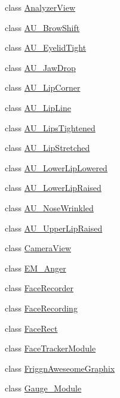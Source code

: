 \begin{DoxyCompactItemize}
\item 
class \hyperlink{class_real_sense_1_1_analyzer_view}{Analyzer\+View}
\item 
class \hyperlink{class_real_sense_1_1_a_u___brow_shift}{A\+U\+\_\+\+Brow\+Shift}
\item 
class \hyperlink{class_real_sense_1_1_a_u___eyelid_tight}{A\+U\+\_\+\+Eyelid\+Tight}
\item 
class \hyperlink{class_real_sense_1_1_a_u___jaw_drop}{A\+U\+\_\+\+Jaw\+Drop}
\item 
class \hyperlink{class_real_sense_1_1_a_u___lip_corner}{A\+U\+\_\+\+Lip\+Corner}
\item 
class \hyperlink{class_real_sense_1_1_a_u___lip_line}{A\+U\+\_\+\+Lip\+Line}
\item 
class \hyperlink{class_real_sense_1_1_a_u___lips_tightened}{A\+U\+\_\+\+Lips\+Tightened}
\item 
class \hyperlink{class_real_sense_1_1_a_u___lip_stretched}{A\+U\+\_\+\+Lip\+Stretched}
\item 
class \hyperlink{class_real_sense_1_1_a_u___lower_lip_lowered}{A\+U\+\_\+\+Lower\+Lip\+Lowered}
\item 
class \hyperlink{class_real_sense_1_1_a_u___lower_lip_raised}{A\+U\+\_\+\+Lower\+Lip\+Raised}
\item 
class \hyperlink{class_real_sense_1_1_a_u___nose_wrinkled}{A\+U\+\_\+\+Nose\+Wrinkled}
\item 
class \hyperlink{class_real_sense_1_1_a_u___upper_lip_raised}{A\+U\+\_\+\+Upper\+Lip\+Raised}
\item 
class \hyperlink{class_real_sense_1_1_camera_view}{Camera\+View}
\item 
class \hyperlink{class_real_sense_1_1_e_m___anger}{E\+M\+\_\+\+Anger}
\item 
class \hyperlink{class_real_sense_1_1_face_recorder}{Face\+Recorder}
\item 
class \hyperlink{class_real_sense_1_1_face_recording}{Face\+Recording}
\item 
class \hyperlink{class_real_sense_1_1_face_rect}{Face\+Rect}
\item 
class \hyperlink{class_real_sense_1_1_face_tracker_module}{Face\+Tracker\+Module}
\item 
class \hyperlink{class_real_sense_1_1_friggn_aweseome_graphix}{Friggn\+Aweseome\+Graphix}
\item 
class \hyperlink{class_real_sense_1_1_gauge___module}{Gauge\+\_\+\+Module}

\end{DoxyCompactItemize}

